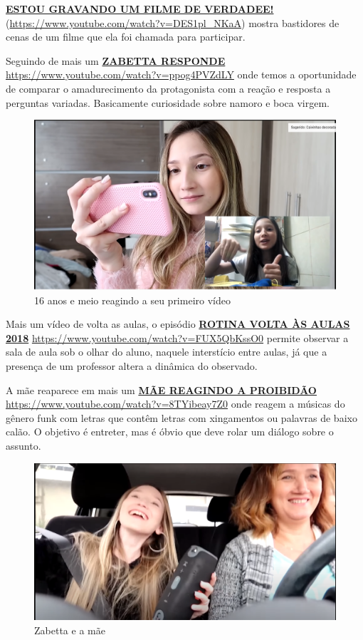 \href{https://www.youtube.com/watch?v=DES1pl_NKaA}{\textbf{ESTOU GRAVANDO UM FILME DE VERDADEE!}} (\url{https://www.youtube.com/watch?v=DES1pl_NKaA}) mostra bastidores de cenas de um filme que ela foi chamada para participar.

Seguindo de mais um \href{https://www.youtube.com/watch?v=ppog4PVZdLY}{\textbf{ZABETTA RESPONDE}} \url{https://www.youtube.com/watch?v=ppog4PVZdLY} onde temos a oportunidade de comparar o amadurecimento da protagonista com a reação e resposta a perguntas variadas. Basicamente curiosidade sobre namoro e boca virgem.

\begin{figure}[h!]
    \centering
    \includegraphics[width=0.7\linewidth]{fig/Zabetta-16-anos3-antes-depois}
    \caption{16 anos e meio reagindo a seu primeiro vídeo}
    \label{fig:zabetta-16-anos3-antes-depois}
\end{figure}

Mais um vídeo de volta as aulas, o episódio \href{https://www.youtube.com/watch?v=FUX5QbKssO0}{\textbf{ROTINA VOLTA ÀS AULAS 2018}} \url{https://www.youtube.com/watch?v=FUX5QbKssO0} permite observar a sala de aula sob o olhar do aluno, naquele interstício entre aulas, já que a presença de um professor altera a dinâmica do observado.

A mãe reaparece em mais um \href{https://www.youtube.com/watch?v=8TYibeay7Z0}{\textbf{MÃE REAGINDO A PROIBIDÃO}} \url{https://www.youtube.com/watch?v=8TYibeay7Z0} onde reagem a músicas do gênero funk com letras que contêm letras com xingamentos ou palavras de baixo calão. O objetivo é entreter, mas é óbvio que deve rolar um diálogo sobre o assunto.

\begin{figure}[h!]
    \centering
    \includegraphics[width=0.7\linewidth]{fig/Zabetta-16-anos-mae}
    \caption{Zabetta e a mãe}
    \label{fig:zabetta-16-anos-mae}
\end{figure}

